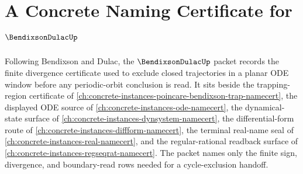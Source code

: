\chapter{A Concrete Naming Certificate for $\BendixsonDulacUp$}
\label{ch:concrete-instances-bendixson-dulac-namecert}

Following Bendixson and Dulac, the $\BendixsonDulacUp$ packet records the finite divergence certificate used to exclude closed trajectories in a planar ODE window before any periodic-orbit conclusion is read. It sits beside the trapping-region certificate of \autoref{ch:concrete-instances-poincare-bendixson-trap-namecert}, the displayed ODE source of \autoref{ch:concrete-instances-ode-namecert}, the dynamical-state surface of \autoref{ch:concrete-instances-dynsystem-namecert}, the differential-form route of \autoref{ch:concrete-instances-diffform-namecert}, the terminal real-name seal of \autoref{ch:concrete-instances-real-namecert}, and the regular-rational readback surface of \autoref{ch:concrete-instances-regseqrat-namecert}. The packet names only the finite sign, divergence, and boundary-read rows needed for a cycle-exclusion handoff.

